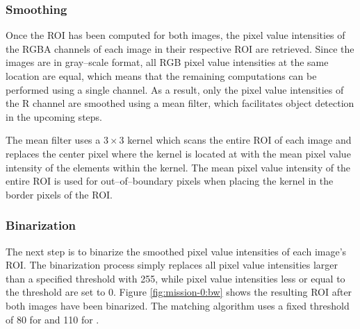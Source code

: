 \subsubsection{Smoothing} \label{subsubsect:case-study:impl:smooth}
Once the ROI has been computed for both images, the pixel value intensities of the RGBA channels of each image in their respective ROI are retrieved. Since the images are in gray--scale format, all RGB pixel value intensities at the same location are equal, which means that the remaining computations can be performed using a single channel. As a result, only the pixel value intensities of the R channel are smoothed using a mean filter, which facilitates object detection in the upcoming steps. \newline

The mean filter uses a $3 \times 3$ kernel which scans the entire ROI of each image and replaces the center pixel where the kernel is located at with the mean pixel value intensity of the elements within the kernel. The mean pixel value intensity of the entire ROI is used for out--of--boundary pixels when placing the kernel in the border pixels of the ROI.

\subsubsection{Binarization} \label{subsubsect:case-study:impl:binarization}
The next step is to binarize the smoothed pixel value intensities of each image's ROI. The binarization process simply replaces all pixel value intensities larger than a specified threshold with 255, while pixel value intensities less or equal to the threshold are set to 0. Figure \ref{fig:mission-0:bw} shows the resulting ROI after both images have been binarized. The matching algorithm uses a fixed threshold of 80 for \usno and 110 for \panstarrs.

